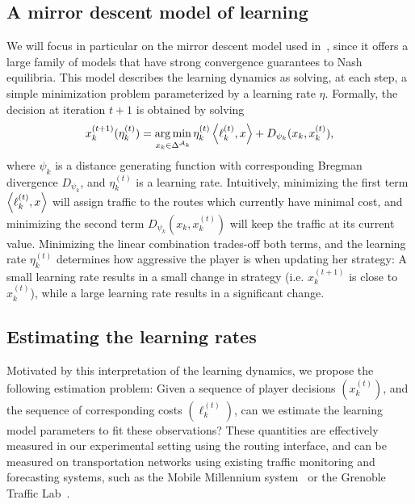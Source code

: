 \documentclass{sig-alternate-ipsn13}
\begin{document}
\subsection{A mirror descent model of learning}
We will focus in particular on the mirror descent model used in~\cite{krichene2015MD}, since it offers a large family of models that have strong convergence guarantees to Nash equilibria. This model describes the learning dynamics as solving, at each step, a simple minimization problem parameterized by a learning rate $\eta$. Formally, the decision at iteration $t+1$ is obtained by solving
\[
x^{(t+1)}_k(\eta^{(t)}_k) = \operatorname*{arg\,min}_{x_k \in \Delta^{\mathcal{A}_k}} \eta^{(t)}_k\left\langle \ell^{(t)}_k, x \right\rangle + D_{\psi_k}(x_k, x^{(t)}_k),
\]
where $\psi_k$ is a distance generating function with corresponding Bregman divergence $D_{\psi_k}$, and $\eta^{(t)}_k$ is a learning rate. Intuitively, minimizing the first term $\left\langle \ell^{(t)}_k, x \right\rangle$ will assign traffic to the routes which currently have minimal cost, and minimizing the second term $D_{\psi_k}(x_k, x^{(t)}_k)$ will keep the traffic at its current value. Minimizing the linear combination trades-off both terms, and the learning rate $\eta_k^{(t)}$ determines how aggressive the player is when updating her strategy: A small learning rate results in a small change in strategy (i.e. $x^{(t+1)}_k$ is close to $x_k^{(t)}$), while a large learning rate results in a significant change.

\subsection{Estimating the learning rates}
Motivated by this interpretation of the learning dynamics, we propose the following estimation problem: Given a sequence of player decisions $(x^{(t)}_k)$, and the sequence of corresponding costs $(\ell_k^{(t)})$, can we estimate the learning model parameters to fit these observations? These quantities are effectively measured in our experimental setting using the routing interface, and can be measured on transportation networks using existing traffic monitoring and forecasting systems, such as the Mobile Millennium system~\cite{bayen2011mobile} or the Grenoble Traffic Lab~\cite{canudasdewit2015grenoble}.
\end{document}
